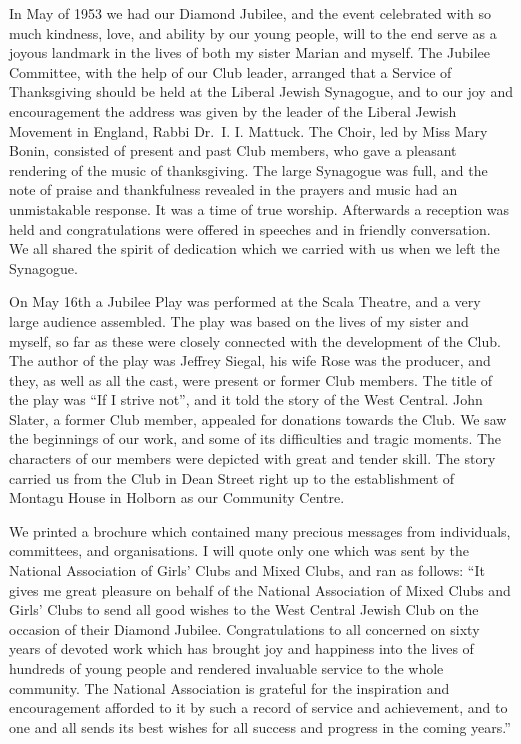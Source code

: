 In May of 1953 we had our Diamond Jubilee, and the
event celebrated with so much kindness, love, and
ability by our young people, will to the end serve as a
joyous landmark in the lives of both my sister Marian
and myself. The Jubilee Committee, with the help of
our Club leader, arranged that a Service of Thanksgiving
should be held at the Liberal Jewish Synagogue, and to
our joy and encouragement the address was given by the
leader of the Liberal Jewish Movement in England,
Rabbi Dr.\ I. I. Mattuck. The Choir, led by Miss Mary
Bonin, consisted of present and past Club members, who
gave a pleasant rendering of the music of thanksgiving.
The large Synagogue was full, and the note of praise and
thankfulness revealed in the prayers and music had an
unmistakable response. It was a time of true worship.
Afterwards a reception was held and congratulations
were offered in speeches and in friendly conversation.
We all shared the spirit of dedication which we carried
with us when we left the Synagogue.

On May 16th a Jubilee Play was performed at the
Scala Theatre, and a very large audience assembled.
The play was based on the lives of my sister and myself,
so far as these were closely connected with the development
of the Club. The author of the play was Jeffrey
Siegal, his wife Rose was the producer, and they, as well
as all the cast, were present or former Club members.
The title of the play was “If I strive not”, and it told
the story of the West Central. John Slater, a former
Club member, appealed for donations towards the Club.
We saw the beginnings of our work, and some of its
difficulties and tragic moments. The characters of our
members were depicted with great and tender skill. The
story carried us from the Club in Dean Street right up
to the establishment of Montagu House in Holborn as
our Community Centre.

We printed a brochure which contained many
precious messages from individuals, committees, and
organisations. I will quote only one which was sent by
the National Association of Girls’ Clubs and Mixed
Clubs, and ran as follows: “It gives me great pleasure
on behalf of the National Association of Mixed Clubs
and Girls’ Clubs to send all good wishes to the West
Central Jewish Club on the occasion of their Diamond
Jubilee. Congratulations to all concerned on sixty years
of devoted work which has brought joy and happiness
into the lives of hundreds of young people and rendered
invaluable service to the whole community. The
National Association is grateful for the inspiration and
encouragement afforded to it by such a record of service
and achievement, and to one and all sends its best
wishes for all success and progress in the coming years.”

